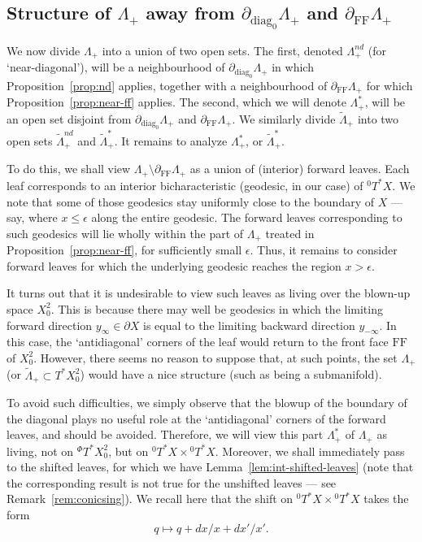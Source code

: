\documentclass[10pt, a4paper, twoside]{amsart}
\numberwithin{equation}{section}
\theoremstyle{remark}
\begin{document}
\subsection{Structure of $\Lambda_+$ away from $\partial_{\mathrm{diag}_0} \Lambda_+$ and $\partial_{\mathrm{FF}} \Lambda_+$}\label{subsec:Lambdastar}

We now divide $\Lambda_+$ into a union of two open sets. The first, denoted $\Lambda_+^{nd}$ (for `near-diagonal'), will be a neighbourhood of $\partial_{\mathrm{diag}_0} \Lambda_+$ in which Proposition~\ref{prop:nd} applies, together with a neighbourhood of $\partial_{\mathrm{FF}} \Lambda_+$ for which Proposition~\ref{prop:near-ff} applies. The second, which we will denote $\Lambda_+^*$, will be an open set disjoint from $\partial_{\mathrm{diag}_0} \Lambda_+$ and $\partial_{\mathrm{FF}} \Lambda_+$. We similarly divide ${\tilde \Lambda}_+$ into two open sets ${\tilde \Lambda}_+^{nd}$ and ${\tilde \Lambda}_+^*$. 
It remains to analyze $\Lambda_+^*$, or ${\tilde \Lambda}_+^*$. 

To do this, we shall view $\Lambda_+ \setminus \partial_{\mathrm{FF}} \Lambda_+$ as a union of (interior) forward leaves. Each leaf corresponds to an interior bicharacteristic (geodesic, in our case) of ${}^0T^* X$. We note that some of those geodesics stay uniformly close to the boundary of $X$ --- say, where $x \leq \epsilon$ along the entire geodesic. The forward leaves corresponding to such geodesics will lie wholly within the part of $\Lambda_+$ treated in Proposition~\ref{prop:near-ff}, for sufficiently small $\epsilon$. Thus, it remains to consider forward leaves for which the underlying geodesic reaches the region $x > \epsilon$. 

It turns out that it is undesirable to view such leaves as living over the blown-up space $X^2_0$. This is because there may well be geodesics in which the limiting forward direction $y_\infty \in \partial X$ is equal to the limiting backward direction $y_{-\infty}$. In this case, the `antidiagonal' corners of the leaf would return to the front face ${\mathrm{FF}}$ of $X^2_0$. However, there seems no reason to suppose that, at such points, the set $\Lambda_+$ (or ${\tilde \Lambda}_+ \subset T^* X^2_0$) would have  a nice structure  (such as being a submanifold).

To avoid such difficulties, we simply observe that the blowup of the boundary of the diagonal plays no useful role at the `antidiagonal' corners of the forward leaves, and should be avoided. Therefore, we will view this part $\Lambda_+^*$ of $\Lambda_+$ as living, not on ${}^\Phi T^* X^2_0$, but on ${}^0 T^* X \times {}^0 T^* X$. Moreover, we shall immediately pass to the shifted leaves, for which we have Lemma~\ref{lem:int-shifted-leaves} (note that the corresponding result is not true for the unshifted leaves --- see Remark~\ref{rem:conicsing}). We recall here that the shift on ${}^0 T^* X \times {}^0 T^* X$ takes the form 
\begin{equation}
q \mapsto q + dx/x + dx'/x'. 
\label{shiftXX}\end{equation}
\end{document}
